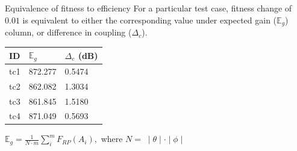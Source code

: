 \documentclass{beamer}
\begin{document}
\begin{frame}{Equivalence of fitness to efficiency}
    \small For a particular test case, fitness change of $0.01$ is equivalent to either the corresponding value under expected gain ($\mathbb E_g$) column, or difference in coupling ($\Delta_c$).
    \begin{table}
        \centering
        \begin{threeparttable}
            \begin{tabular}{|C{1cm}|C{2.5cm}|C{2.5cm}|} \hline
                ID& $\mathbb E_g$ & $\Delta_{c}$ (dB) \\ \hline
                tc1 & 872.277 & 0.5474 \\ \hline
                tc2 & 862.082 & 1.3034 \\ \hline
                tc3 & 861.845 & 1.5180 \\ \hline
                tc4 & 871.049 & 0.5693 \\
                \hline\end{tabular}
        \end{threeparttable}
    \end{table}
    \tiny
    $\mathbb E_g = \frac{1}{N \cdot m} \sum_{i}^m F_{RP}(A_i),$
    where $N = \;\mid \theta \mid \cdot \mid \phi \mid$
\end{frame}
\end{document}

